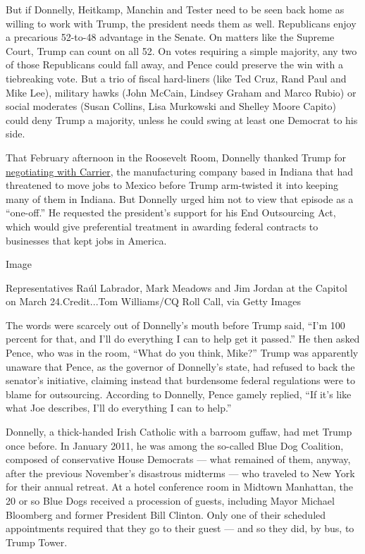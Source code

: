 But if Donnelly, Heitkamp, Manchin and Tester need to be seen back home
as willing to work with Trump, the president needs them as well.
Republicans enjoy a precarious 52-to-48 advantage in the Senate. On
matters like the Supreme Court, Trump can count on all 52. On votes
requiring a simple majority, any two of those Republicans could fall
away, and Pence could preserve the win with a tiebreaking vote. But a
trio of fiscal hard-liners (like Ted Cruz, Rand Paul and Mike Lee),
military hawks (John McCain, Lindsey Graham and Marco Rubio) or social
moderates (Susan Collins, Lisa Murkowski and Shelley Moore Capito) could
deny Trump a majority, unless he could swing at least one Democrat to
his side.

That February afternoon in the Roosevelt Room, Donnelly thanked Trump
for
\href{https://www.nytimes3xbfgragh.onion/2016/12/01/business/economy/trump-carrier-pence-jobs.html}{negotiating
with Carrier}, the manufacturing company based in Indiana that had
threatened to move jobs to Mexico before Trump arm-twisted it into
keeping many of them in Indiana. But Donnelly urged him not to view that
episode as a ``one-off.'' He requested the president's support for his
End Outsourcing Act, which would give preferential treatment in awarding
federal contracts to businesses that kept jobs in America.

Image

Representatives Raúl Labrador, Mark Meadows and Jim Jordan at the
Capitol on March 24.Credit...Tom Williams/CQ Roll Call, via Getty Images

The words were scarcely out of Donnelly's mouth before Trump said, ``I'm
100 percent for that, and I'll do everything I can to help get it
passed.'' He then asked Pence, who was in the room, ``What do you think,
Mike?'' Trump was apparently unaware that Pence, as the governor of
Donnelly's state, had refused to back the senator's initiative, claiming
instead that burdensome federal regulations were to blame for
outsourcing. According to Donnelly, Pence gamely replied, ``If it's like
what Joe describes, I'll do everything I can to help.''

Donnelly, a thick-handed Irish Catholic with a barroom guffaw, had met
Trump once before. In January 2011, he was among the so-called Blue Dog
Coalition, composed of conservative House Democrats --- what remained of
them, anyway, after the previous November's disastrous midterms --- who
traveled to New York for their annual retreat. At a hotel conference
room in Midtown Manhattan, the 20 or so Blue Dogs received a procession
of guests, including Mayor Michael Bloomberg and former President Bill
Clinton. Only one of their scheduled appointments required that they go
to their guest --- and so they did, by bus, to Trump Tower.

